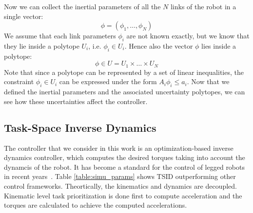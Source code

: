 Now we can collect the inertial parameters of all the $N$ links of the robot in a single vector:
\begin{equation*}
\phi = (\phi_1, \dots, \phi_N)
\end{equation*}
We assume that each link parameters $\phi_i$ are not known exactly, but we know that they lie inside a polytope $U_i$, i.e. $\phi_i \in U_i$.
Hence also the vector $\phi$ lies inside a polytope:
$$
\phi \in U = U_1 \times \dots \times U_N
$$
Note that since a polytope can be represented by a set of linear inequalities, the constraint $\phi_i \in U_i$ can be expressed under the form $A_i \phi_i \le a_i$. Now that we defined the inertial parameters and the associated uncertainty polytopes, we can see how these uncertainties affect the controller.

\subsection{Task-Space Inverse Dynamics}
The controller that we consider in this work is an optimization-based inverse dynamics controller, which computes the desired torques taking into account the dynamcis of the robot. It has become a standard for the control of legged robots in recent years~\cite{DelPrete2014c,Herzog2016,Sentis2004,Saab2011}. Table \ref{table:simu_params} shows TSID outperforming other control frameworks.
Theortically, the kinematics and dynamics are decoupled. Kinematic level task prioritization is done first to compute acceleration and the torques are calculated to achieve the computed accelerations. 

